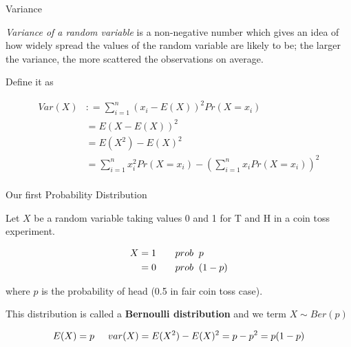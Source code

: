 \documentclass{beamer}\usepackage[]{graphicx}\usepackage[]{color}
\begin{document}
\begin{frame}[fragile]{Variance \;\;}

\emph{Variance of a random variable} is a non-negative number which gives an idea of how widely spread the values of the random variable are likely to be; the larger the variance, the more scattered the observations on average. \pause \newline

Define it as

\begin{align}
Var(X) & : = \sum_{i=1}^{n} (x_{i} - E(X))^2 Pr(X=x_{i})  \\
          & = E(X - E(X))^2 \\
          & = E(X^2) - E(X)^2 \\
          & = \sum_{i=1}^{n} x^2_{i} Pr(X=x_{i}) - \left (\sum_{i=1}^{n} x_{i} Pr (X= x_{i}) \right)^2 \\
\end{align}

\end{frame}


\begin{frame}[fragile]{Our first Probability Distribution \;\;}

Let $X$ be a random variable taking values 0 and 1 for T and H in a coin toss experiment. \pause \newline

\begin{align}
X & = 1 \hspace{0.5 cm}  \;\; prob \;\; p \\
  & = 0 \hspace{0.5 cm}  \;\;prob \;\; (1-p) \\
\end{align}

where $p$ is the probability of head (0.5 in fair coin toss case).\pause \newline

This distribution is called a \textbf{Bernoulli distribution} and we term
$ X \sim Ber(p) $

$$ E(X) = p \hspace{0.5 cm} var(X) = E(X^2) - E(X)^2 = p - p^2 = p(1-p) $$

\end{frame}
\end{document}
